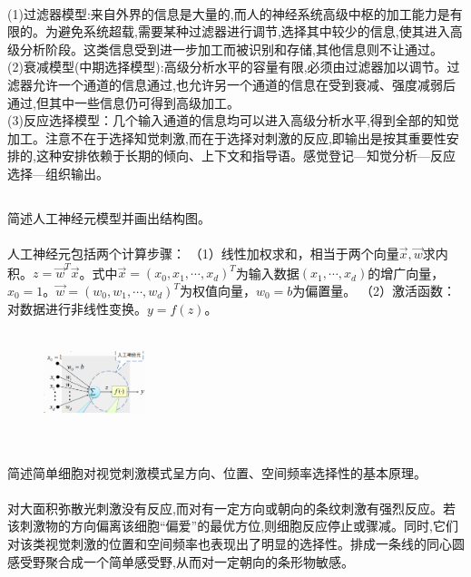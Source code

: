 \documentclass[UTF8]{ctexart}
\begin{document}
\paragraph{}
(1)过滤器模型:来自外界的信息是大量的,而人的神经系统高级中枢的加工能力是有限的。为避免系统超载,需要某种过滤器进行调节,选择其中较少的信息,使其进入高级分析阶段。这类信息受到进一步加工而被识别和存储,其他信息则不让通过。\\
(2)衰减模型(中期选择模型):高级分析水平的容量有限,必须由过滤器加以调节。过滤器允许一个通道的信息通过,也允许另一个通道的信息在受到衰减、强度减弱后通过,但其中一些信息仍可得到高级加工。\\
(3)反应选择模型：几个输入通道的信息均可以进入高级分析水平,得到全部的知觉加工。注意不在于选择知觉刺激,而在于选择对刺激的反应,即输出是按其重要性安排的,这种安排依赖于长期的倾向、上下文和指导语。感觉登记—知觉分析—反应选择—组织输出。
\subsection{}
简述人工神经元模型并画出结构图。
\paragraph{}
人工神经元包括两个计算步骤：
（1）线性加权求和，相当于两个向量$\vec x, \vec w$求内积。$z=\vec w^T\vec x$。式中$\vec x=(x_0,x_1,\cdots,x_d)^T$为输入数据$(x_1,\cdots,x_d)$的增广向量，$x_0=1$。$\vec w=(w_0,w_1,\cdots,w_d)^T$为权值向量，$w_0=b$为偏置量。
（2）激活函数：对数据进行非线性变换。$y=f(z)$。
\begin{figure}[H]
\centering
\includegraphics[width=3cm,height=3cm]{2017-1.png}
\end{figure}
\subsection{}
简述简单细胞对视觉刺激模式呈方向、位置、空间频率选择性的基本原理。
\paragraph{}
对大面积弥散光刺激没有反应,而对有一定方向或朝向的条纹刺激有强烈反应。若该刺激物的方向偏离该细胞“偏爱”的最优方位,则细胞反应停止或骤减。同时,它们对该类视觉刺激的位置和空间频率也表现出了明显的选择性。排成一条线的同心圆感受野聚合成一个简单感受野,从而对一定朝向的条形物敏感。
\end{document}
